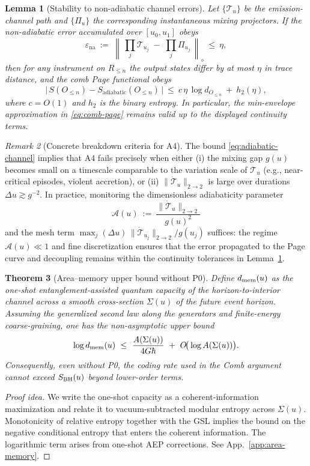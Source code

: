 \documentclass[aps,prd,preprint,onecolumn,superscriptaddress,nofootinbib,longbibliography,floatfix,11pt,showpacs,showkeys]{revtex4-2}
\theoremstyle{plain}
\newtheorem{theorem}{Theorem}
\newtheorem{lemma}[theorem]{Lemma}
\theoremstyle{definition}
\theoremstyle{remark}
\newtheorem{remark}[theorem]{Remark}
\begin{document}
\begin{lemma}[Stability to non-adiabatic channel errors]\label{lem:comb-stability}
Let $\{\mathcal{T}_u\}$ be the emission-channel path and $\{\Pi_u\}$ the corresponding instantaneous mixing projectors. If the non-adiabatic error accumulated over $[u_0,u_1]$ obeys
\[
\varepsilon_{\mathrm{na}} \ :=\ \left\|\,\prod_{j}\mathcal{T}_{u_j}\;-\;\prod_{j}\Pi_{u_j}\,\right\|_{\diamond}
\ \le\ \eta,
\]
then for any instrument on $R_{\le n}$ the output states differ by at most $\eta$ in trace distance, and the comb Page functional obeys
\[
\big|\,S(O_{\le n}) - S_{\mathrm{adiabatic}}(O_{\le n})\,\big| \ \le\ c\,\eta\,\log d_{O_{\le n}} \ +\ h_2(\eta),
\]
where $c=O(1)$ and $h_2$ is the binary entropy. In particular, the min-envelope approximation in \eqref{eq:comb-page} remains valid up to the displayed continuity terms.
\end{lemma}

\begin{remark}[Concrete breakdown criteria for A4]\label{rem:adiabatic-breakdown}
The bound \eqref{eq:adiabatic-channel} implies that A4 fails precisely when either (i) the mixing gap $g(u)$ becomes small on a timescale comparable to the variation scale of $\mathcal{T}_u$ (e.g., near-critical episodes, violent accretion), or (ii) $\|\dot{\mathcal{T}}_u\|_{2\to 2}$ is large over durations $\Delta u\gtrsim g^{-2}$. In practice, monitoring the dimensionless adiabaticity parameter
\[
\mathcal{A}(u)\ :=\ \frac{\|\dot{\mathcal{T}}_u\|_{2\to 2}}{g(u)^2}
\]
and the mesh term $\max_j (\Delta u)\,\|\dot{\mathcal{T}}_{u_j}\|_{2\to 2}/g(u_j)$ suffices: the regime $\mathcal{A}(u)\ll 1$ and fine discretization ensures that the error propagated to the Page curve and decoupling remains within the continuity tolerances in Lemma~\ref{lem:comb-stability}.
\end{remark}

\begin{theorem}[Area--memory upper bound without P0]\label{thm:area-memory-upper}
Define $d_{\rm mem}(u)$ as the one-shot entanglement-assisted quantum capacity of the horizon-to-interior channel across a smooth cross-section $\Sigma(u)$ of the future event horizon. Assuming the generalized second law along the generators and finite-energy coarse-graining, one has the non-asymptotic upper bound
\begin{equation}\label{eq:area-memory-upper}
\log d_{\rm mem}(u)\ \le\ \frac{A\!\left(\Sigma(u)\right)}{4G\hbar}\ +\ O\!\big(\log A(\Sigma(u))\big).
\end{equation}
Consequently, even without P0, the coding rate used in the Comb argument cannot exceed $S_{\rm BH}(u)$ beyond lower-order terms.
\end{theorem}
\begin{proof}[Proof idea]
We write the one-shot capacity as a coherent-information maximization and relate it to vacuum-subtracted modular entropy across $\Sigma(u)$. Monotonicity of relative entropy together with the GSL implies the bound on the negative conditional entropy that enters the coherent information. The logarithmic term arises from one-shot AEP corrections. See App.~\ref{app:area-memory}.
\end{proof}
\end{document}
